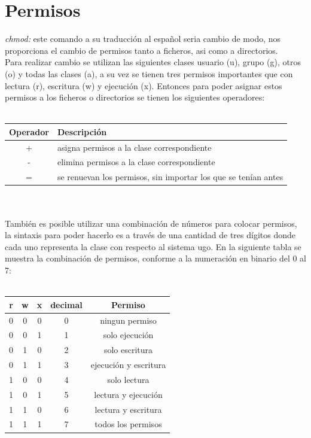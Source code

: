 \documentclass[10pt,a4paper,titlepage]{article}
\begin{document}
	\section*{Permisos}
	\emph{chmod:} este comando a su traducción al español seria cambio de modo, nos proporciona el cambio de permisos tanto a ficheros, asi como a directorios.
	\\
	Para realizar cambio se utilizan las siguientes clases usuario (u), grupo (g), otros (o) y todas las clases (a), a su vez se tienen tres permisos importantes que con lectura (r), escritura (w) y ejecución (x). Entonces para poder asignar estos permisos a los ficheros o directorios se tienen los siguientes operadores:
	\\
	\\
	\begin{tabular}{|c|p{8cm}|}
		\hline
		Operador & Descripción \\
		\hline
		+ & asigna permisos a la clase correspondiente \\
		\hline
		- & elimina permisos a la clase correspondiente \\
		\hline
		= & se renuevan los permisos, sin importar los que se tenían antes \\
		\hline
	\end{tabular}
	\\
	\\
	También es posible utilizar una combinación de números para colocar permisos, la sintaxis para poder hacerlo es a través de una cantidad de tres dígitos donde cada uno representa la clase con respecto al sistema ugo. En la siguiente tabla se muestra la combinación de permisos, conforme a la numeración en binario del 0 al 7:
	\\
	\\
	\begin{tabular}{|c|c|c|c|c|}
		\hline
		r & w & x & decimal & Permiso \\
		\hline
		0 & 0 & 0 & 0 & ningun permiso \\
		\hline
		0 & 0 & 1 & 1 & solo ejecución \\
		\hline
		0 & 1 & 0 & 2 & solo escritura \\
		\hline
		0 & 1 & 1 & 3 & ejecución y escritura \\
		\hline
		1 & 0 & 0 & 4 & solo lectura \\
		\hline
		1 & 0 & 1 & 5 & lectura y ejecución \\
		\hline
		1 & 1 & 0 & 6 & lectura y escritura \\
		\hline
		1 & 1 & 1 & 7 & todos los permisos \\
		\hline
	\end{tabular}
\end{document}
